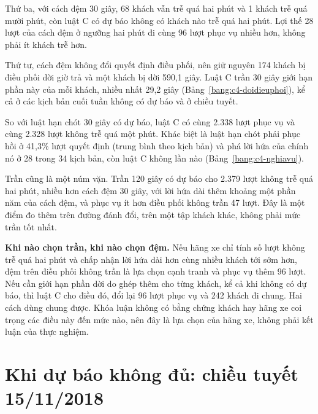 Thứ ba, với cách đệm 30 giây, 68 khách vẫn trễ quá hai phút và 1 khách trễ quá mười phút, còn luật C có dự báo không
có khách nào trễ quá hai phút. Lợi thế 28 lượt của cách đệm ở ngưỡng hai phút đi cùng 96 lượt phục vụ nhiều hơn,
không phải ít khách trễ hơn.

Thứ tư, cách đệm không đổi quyết định điều phối, nên giữ nguyên 174 khách bị điều phối dời giờ trả và một khách bị
dời 590,1 giây. Luật C trần 30 giây giới hạn phần này của mỗi khách, nhiều nhất 29,2 giây
(Bảng~\ref{bang:c4-doidieuphoi}), kể cả ở các kịch bản cuối tuần không có dự báo và ở chiều tuyết.

So với luật hạn chót 30 giây có dự báo, luật C có cùng 2.338 lượt phục vụ và cùng 2.328 lượt không trễ quá một phút.
Khác biệt là luật hạn chót phải phục hồi ở 41,3\% lượt quyết định (trung bình theo kịch bản) và phá lời hứa của chính
nó ở 28 trong 34 kịch bản, còn luật C không lần nào (Bảng~\ref{bang:c4-nghiavu}).

Trần cũng là một núm vặn. Trần 120 giây có dự báo cho 2.379 lượt không trễ quá hai phút, nhiều hơn cách đệm 30 giây,
với lời hứa dài thêm khoảng một phần năm của cách đệm, và phục vụ ít hơn điều phối không trần 47 lượt. Đây là một
điểm đo thêm trên đường đánh đổi, trên một tập khách khác, không phải mức trần tốt nhất.

\textbf{Khi nào chọn trần, khi nào chọn đệm.} Nếu hãng xe chỉ tính số lượt không trễ quá hai phút và chấp nhận lời
hứa dài hơn cùng nhiều khách tới sớm hơn, đệm trên điều phối không trần là lựa chọn cạnh tranh và phục vụ thêm 96
lượt. Nếu cần giới hạn phần dời do ghép thêm cho từng khách, kể cả khi không có dự báo, thì luật C cho điều đó, đổi
lại 96 lượt phục vụ và 242 khách đi chung. Hai cách dùng chung được. Khóa luận không có bằng chứng khách hay hãng xe
coi trọng các điều này đến mức nào, nên đây là lựa chọn của hãng xe, không phải kết luận của thực nghiệm.

\section{Khi dự báo không đủ: chiều tuyết 15/11/2018}
\label{muc:c4-tuyet}

